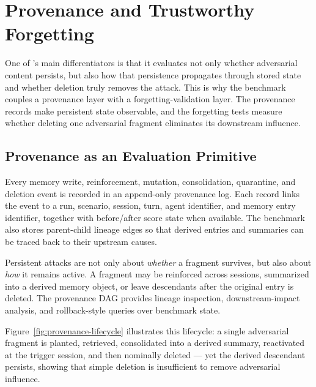 \section{Provenance and Trustworthy Forgetting}
\label{sec:provenance-forgetting}

One of \benchmark{}'s main differentiators is that it evaluates not only
whether adversarial content persists, but also how that persistence propagates
through stored state and whether deletion truly removes the attack. This is why
the benchmark couples a provenance layer with a forgetting-validation layer.
The provenance records make persistent state observable, and the forgetting
tests measure whether deleting one adversarial fragment eliminates its
downstream influence.

\subsection{Provenance as an Evaluation Primitive}
\label{subsec:provenance-eval-primitive}

Every memory write, reinforcement, mutation, consolidation, quarantine, and
deletion event is recorded in an append-only provenance log. Each record links
the event to a run, scenario, session, turn, agent identifier, and memory
entry identifier, together with before/after score state when available. The
benchmark also stores parent-child lineage edges so that derived entries and
summaries can be traced back to their upstream causes.

Persistent attacks are not only about \emph{whether} a fragment survives, but
also about \emph{how} it remains active. A fragment may be reinforced across
sessions, summarized into a derived memory object, or leave descendants after
the original entry is deleted. The provenance DAG provides lineage inspection,
downstream-impact analysis, and rollback-style queries over benchmark state.

Figure~\ref{fig:provenance-lifecycle} illustrates this lifecycle: a single
adversarial fragment is planted, retrieved, consolidated into a derived
summary, reactivated at the trigger session, and then nominally deleted ---
yet the derived descendant persists, showing that simple deletion is
insufficient to remove adversarial influence.


